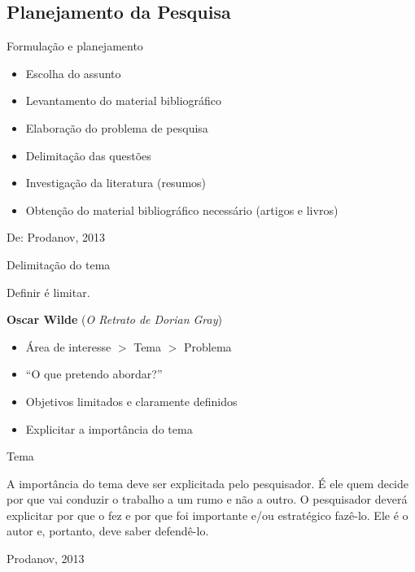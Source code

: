 \documentclass{beamer}
\begin{document}
\subsection{Planejamento da Pesquisa}

\begin{frame}{Formulação e planejamento}
  \begin{itemize}
  \item Escolha do assunto
  \item Levantamento do material bibliográfico
  \item Elaboração do problema de pesquisa
  \item Delimitação das questões
  \item Investigação da literatura (resumos)
  \item Obtenção do material bibliográfico necessário (artigos e livros)
  \end{itemize}
  De: Prodanov, 2013
\end{frame}

\begin{frame}{Delimitação do tema}
  \begin{block}{}
    Definir é limitar.

    \bigskip
    {\bf Oscar Wilde} ({\em O Retrato de Dorian Gray})
  \end{block}
  \begin{itemize}
  \item Área de interesse $>$ Tema $>$ Problema
  \item ``O que pretendo abordar?''
  \item Objetivos limitados e claramente definidos
  \item Explicitar a importância do tema
  \end{itemize}
\end{frame}

\begin{frame}{Tema}
  \begin{block}{}
    A importância do tema deve ser explicitada pelo pesquisador. É ele
    quem decide por que vai conduzir o trabalho a um rumo e não a
    outro. O pesquisador deverá explicitar por que o fez e por que foi
    importante e/ou estratégico fazê-lo. Ele é o autor e, portanto,
    deve saber defendê-lo.
  \end{block}
  Prodanov, 2013
\end{frame}
\end{document}
